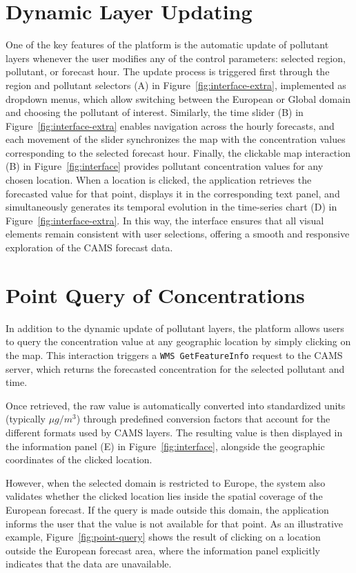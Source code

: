 \section{Dynamic Layer Updating}
One of the key features of the platform is the automatic update of pollutant layers whenever the user modifies any of the control parameters: selected region, pollutant, or forecast hour. The update process is triggered first through the region and pollutant selectors  (A) in Figure~\ref{fig:interface-extra}, implemented as dropdown menus, which allow switching between the European or Global domain and choosing the pollutant of interest. Similarly, the time slider (B) in Figure~\ref{fig:interface-extra} enables navigation across the hourly forecasts, and each movement of the slider synchronizes the map with the concentration values corresponding to the selected forecast hour. Finally, the clickable map interaction (B) in Figure~\ref{fig:interface} provides pollutant concentration values for any chosen location. When a location is clicked, the application retrieves the forecasted value for that point, displays it in the corresponding text panel, and simultaneously generates its temporal evolution in the time-series chart (D) in Figure~\ref{fig:interface-extra}. In this way, the interface ensures that all visual elements remain consistent with user selections, offering a smooth and responsive exploration of the CAMS forecast data.



\section{Point Query of Concentrations}
In addition to the dynamic update of pollutant layers, the platform allows users to query
the concentration value at any geographic location by simply clicking on the map. This
interaction triggers a \texttt{WMS GetFeatureInfo} request to the CAMS server, which
returns the forecasted concentration for the selected pollutant and time. 

Once retrieved, the raw value is automatically converted into standardized units
(typically $\mu g/m^3$) through predefined conversion factors that account for the different
formats used by CAMS layers. The resulting value is then displayed in the information
panel (E) in Figure~\ref{fig:interface}, alongside the geographic coordinates of the clicked
location. 

However, when the selected domain is restricted to Europe, the system also validates
whether the clicked location lies inside the spatial coverage of the European forecast. 
If the query is made outside this domain, the application informs the user that the value is
not available for that point. As an illustrative example, Figure~\ref{fig:point-query} shows
the result of clicking on a location outside the European forecast area, where the
information panel explicitly indicates that the data are unavailable. 

